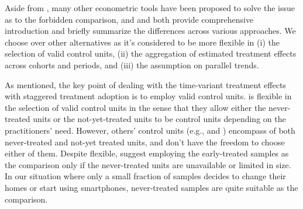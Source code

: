 Aside from \cite{callaway2021difference}, many other econometric tools have been proposed to solve the issue as to the forbidden comparison, and \cite{roth2023s} and \cite{de2023two} both provide comprehensive introduction and briefly summarize the differences across various approaches.
We choose \cite{callaway2021difference} over other alternatives as it's considered to be more flexible in (i) the selection of valid control units, (ii) the aggregation of estimated treatment effects across cohorts and periods, and (iii) the assumption on parallel trends.




As mentioned, the key point of dealing with the time-variant treatment effects with staggered treatment adoption is to employ valid control units.
\cite{callaway2021difference} is flexible in the selection of valid control units in the sense that they allow either the never-treated units or the not-yet-treated units to be control units depending on the practitioners' need. However, others' control units (e.g., \cite{sun2021estimating} and \cite{borusyak2024revisiting}) encompass of both never-treated and not-yet treated units, and don't have the freedom to choose either of them. Despite flexible, \cite{callaway2021difference} suggest employing the early-treated samples as the comparison only if the never-treated units are unavailable or limited in size. In our situation where only a small fraction of samples decides to change their homes or start using smartphones, never-treated samples are quite suitable as the comparison.

